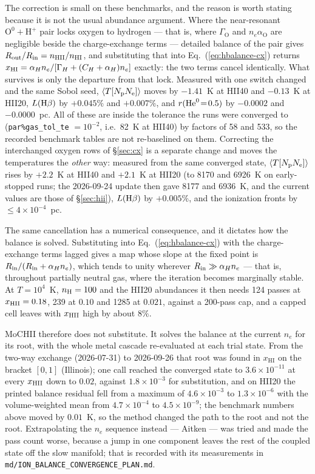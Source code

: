 \documentclass[english,a4paper]{my_memo}
\newcommand{\code}[1]{\texttt{#1}}
\newcommand{\xHI}{x_{\mathrm{HI}}}
\begin{document}
The correction is small on these benchmarks, and the reason is worth
stating because it is not the usual abundance argument.  Where the
near-resonant $\mathrm{O}^{0} + \mathrm{H}^{+}$ pair locks oxygen to
hydrogen --- that is, where $\Gamma_{\mathrm{O}}$ and
$n_e\alpha_{\mathrm{O}}$ are negligible beside the charge-exchange terms
--- detailed balance of the pair gives
$R_{\rm out}/R_{\rm in} = n_{\rm HII}/n_{\rm HI}$, and substituting that
into Eq.~(\ref{eq:hbalance-cx}) returns
$x_{\rm HI} = \alpha_H n_e / [\Gamma_H + (C_H+\alpha_H)n_e]$ exactly: the
two terms cancel identically.  What survives is only the departure from
that lock.  Measured with one switch changed and the same Sobol seed,
$\langle T[N_{\rm p}N_{\rm e}]\rangle$ moves by $-1.41$~K at HII40 and
$-0.13$~K at HII20, $L({\rm H}\beta)$ by $+0.045\%$ and $+0.007\%$, and
$r({\rm He}^0\!=\!0.5)$ by $-0.0002$ and $-0.0000$~pc.  All of these are
inside the tolerance the runs were converged to
(\code{par\%gas\_tol\_te} $=10^{-2}$, i.e.\ 82~K at HII40) by factors of
58 and 533, so the recorded benchmark tables are not re-baselined on them.
Correcting the interchanged oxygen rows of \S\ref{sec:cx} is a separate
change and moves the temperatures the \emph{other} way: measured from the
same converged state, $\langle T[N_{\rm p}N_{\rm e}]\rangle$ rises by
$+2.2$~K at HII40 and $+2.1$~K at HII20 (to 8170 and 6926~K on early-stopped
runs; the 2026-09-24 update then gave 8177 and 6936~K, and the current values
are those of \S\ref{sec:hii}),
$L({\rm H}\beta)$ by $+0.005\%$, and the ionization fronts by
$\leq 4{\times}10^{-4}$~pc.

The same cancellation has a numerical consequence, and it dictates how the
balance is solved.  Substituting into Eq.~(\ref{eq:hbalance-cx}) with the
charge-exchange terms lagged gives a map whose slope at the fixed point is
$R_{\rm in}/(R_{\rm in} + \alpha_H n_e)$, which tends to unity wherever
$R_{\rm in} \gg \alpha_H n_e$ --- that is, throughout partially neutral
gas, where the iteration becomes marginally stable.  At $T=10^4$~K,
$n_{\rm H}=100$ and the HII20 abundances it then needs 124 passes at
$x_{\rm HII}=0.18$, 239 at $0.10$ and 1285 at $0.021$, against a 200-pass
cap, and a capped cell leaves with $x_{\rm HII}$ high by about $8\%$.

MoCHII therefore does not substitute.  It solves the balance at the
current $n_e$ for its root, with the whole metal cascade re-evaluated at
each trial state.  From the two-way exchange (2026-07-31) to 2026-09-26
that root was found in $\xHI$ on the bracket $[0,1]$ (Illinois); one call
reached the converged state to
$3.6\times10^{-11}$ at every $x_{\rm HII}$ down to $0.02$, against
$1.8\times10^{-3}$ for substitution, and on HII20 the printed balance
residual fell from a maximum of $4.6\times10^{-3}$ to $1.3\times10^{-6}$
with the volume-weighted mean from $4.7\times10^{-4}$ to
$4.5\times10^{-9}$; the benchmark numbers above moved by $0.01$~K, so the
method changed the path to the root and not the root.  Extrapolating the
$n_e$ sequence instead --- Aitken --- was tried and made the pass count
worse, because a jump in one component leaves the rest of the coupled state
off the slow manifold; that is recorded with its measurements in
\code{md/ION\_BALANCE\_CONVERGENCE\_PLAN.md}.
\end{document}
